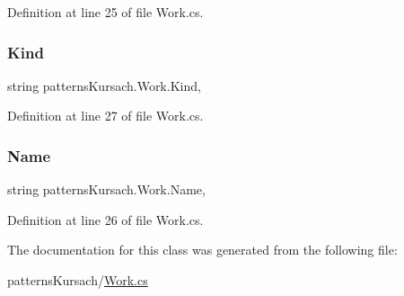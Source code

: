 Definition at line 25 of file Work.\+cs.

\mbox{\label{classpatterns_kursach_1_1_work_a40621d3042128256f9d180095fba721a}} 
\subsubsection{\texorpdfstring{Kind}{Kind}}
{\footnotesize\ttfamily string patterns\+Kursach.\+Work.\+Kind\hspace{0.3cm}{\ttfamily [get]}, {\ttfamily [set]}}



Definition at line 27 of file Work.\+cs.

\mbox{\label{classpatterns_kursach_1_1_work_af3706083bb585a0cf3b6a69cddf9c45f}} 
\subsubsection{\texorpdfstring{Name}{Name}}
{\footnotesize\ttfamily string patterns\+Kursach.\+Work.\+Name\hspace{0.3cm}{\ttfamily [get]}, {\ttfamily [set]}}



Definition at line 26 of file Work.\+cs.



The documentation for this class was generated from the following file\+:\begin{DoxyCompactItemize}
\item 
patterns\+Kursach/\mbox{\hyperlink{_work_8cs}{Work.\+cs}}\end{DoxyCompactItemize}
